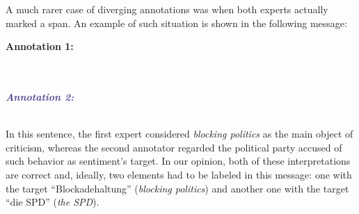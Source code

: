 
A much rarer case of diverging  annotations was when
both experts actually marked a  span.  An example
of such situation is shown in the following message:
\begin{example}\label{snt:exmp:targt-disagr}
  \textcolor{red3}{\textbf{Annotation
      1:}}\\
  \upshape{}\\[0.5em]
  \noindent\itshape{}\\[0.6em]\itshape

  \noindent\textcolor{darkslateblue}{\textbf{\itshape Annotation
      2:}}\\
  \upshape{}\\[0.5em]
  \noindent\itshape{}
\end{example}
In this sentence, the first expert considered \emph{blocking politics}
as the main object of criticism, whereas the second annotator regarded
the political party accused of such behavior as sentiment's target.
In our opinion, both of these interpretations are correct and,
ideally, two  elements had to be labeled in this
message: one with the target ``Blockadehaltung'' (\emph{blocking
  politics}) and another one with the target ``die SPD'' (\emph{the
  SPD}).

